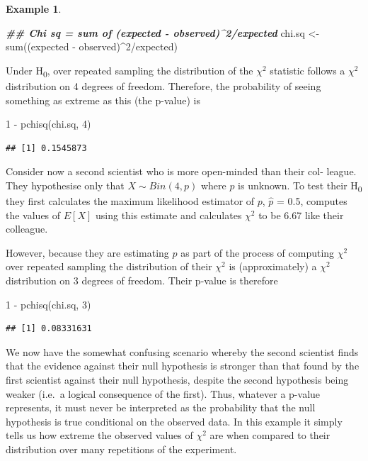 \documentclass[
]{book}
\newenvironment{Shaded}{\begin{snugshade}}{\end{snugshade}}
\newcommand{\DecValTok}[1]{\textcolor[rgb]{0.00,0.00,0.81}{#1}}
\newcommand{\DocumentationTok}[1]{\textcolor[rgb]{0.56,0.35,0.01}{\textbf{\textit{#1}}}}
\newcommand{\FunctionTok}[1]{\textcolor[rgb]{0.00,0.00,0.00}{#1}}
\newcommand{\NormalTok}[1]{#1}
\newcommand{\OtherTok}[1]{\textcolor[rgb]{0.56,0.35,0.01}{#1}}
\newcommand{\SpecialCharTok}[1]{\textcolor[rgb]{0.00,0.00,0.00}{#1}}
\theoremstyle{definition}
\theoremstyle{definition}
\newtheorem{example}{Example}[chapter]
\theoremstyle{definition}
\theoremstyle{definition}
\theoremstyle{remark}
\begin{document}
\begin{example}
\begin{Shaded}
\begin{Highlighting}[]
\DocumentationTok{\#\# Chi sq = sum of (expected {-} observed)\^{}2/expected}
\NormalTok{chi.sq }\OtherTok{\textless{}{-}} \FunctionTok{sum}\NormalTok{((expected }\SpecialCharTok{{-}}\NormalTok{ observed)}\SpecialCharTok{\^{}}\DecValTok{2}\SpecialCharTok{/}\NormalTok{expected)}
\end{Highlighting}
\end{Shaded}

Under H\textsubscript{0}, over repeated sampling the distribution of the \(\chi^2\) statistic follows a \(\chi^2\) distribution on 4 degrees of freedom. Therefore, the probability of seeing something as extreme as this (the p-value) is

\begin{Shaded}
\begin{Highlighting}[]
\DecValTok{1} \SpecialCharTok{{-}} \FunctionTok{pchisq}\NormalTok{(chi.sq, }\DecValTok{4}\NormalTok{)}
\end{Highlighting}
\end{Shaded}

\begin{verbatim}
## [1] 0.1545873
\end{verbatim}

Consider now a second scientist who is more open-minded than their col- league. They hypothesise only that \(X \sim Bin(4, p)\) where \(p\) is unknown. To test their H\textsubscript{0} they first calculates the maximum likelihood estimator of \(p\), \(\hat{p}\) = 0.5, computes the values of \(E[X]\) using this estimate and calculates \(\chi^2\) to be 6.67 like their colleague.

However, because they are estimating \(p\) as part of the process of computing \(\chi^2\) over repeated sampling the distribution of their \(\chi^2\) is (approximately) a \(\chi^2\) distribution on 3 degrees of freedom. Their p-value is therefore

\begin{Shaded}
\begin{Highlighting}[]
\DecValTok{1} \SpecialCharTok{{-}} \FunctionTok{pchisq}\NormalTok{(chi.sq, }\DecValTok{3}\NormalTok{)}
\end{Highlighting}
\end{Shaded}

\begin{verbatim}
## [1] 0.08331631
\end{verbatim}

We now have the somewhat confusing scenario whereby the second scientist finds that the evidence against their null hypothesis is stronger than that found by the first scientist against their null hypothesis, despite the second hypothesis being weaker (i.e.~a logical consequence of the first). Thus, whatever a p-value represents, it must never be interpreted as the probability that the null hypothesis is true conditional on the observed data. In this example it simply tells us how extreme the observed values of \(\chi^2\) are when compared to their distribution over many repetitions of the experiment.
\end{example}
\end{document}
